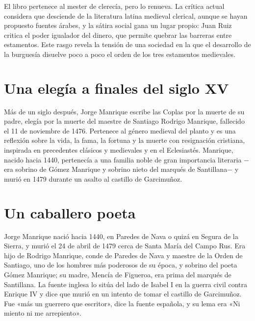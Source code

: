 \documentclass{book}
\begin{document}
El libro pertenece al mester de clerecía, pero lo renueva. La crítica actual considera que desciende de la literatura latina medieval clerical, aunque se hayan propuesto fuentes árabes, y la sátira social gana un lugar propio: Juan Ruiz critica el poder igualador del dinero, que permite quebrar las barreras entre estamentos. Este rasgo revela la tensión de una sociedad en la que el desarrollo de la burguesía disuelve poco a poco el orden de los tres estamentos medievales.


\section{Una elegía a finales del siglo XV}

Más de un siglo después, Jorge Manrique escribe las Coplas por la muerte de su padre, elegía por la muerte del maestre de Santiago Rodrigo Manrique, fallecido el 11 de noviembre de 1476. Pertenece al género medieval del planto y es una reflexión sobre la vida, la fama, la fortuna y la muerte con resignación cristiana, inspirada en precedentes clásicos y medievales y en el Eclesiastés. Manrique, nacido hacia 1440, pertenecía a una familia noble de gran importancia literaria \(-\)era sobrino de Gómez Manrique y sobrino nieto del marqués de Santillana\(-\) y murió en 1479 durante un asalto al castillo de Garcimuñoz.


\section{Un caballero poeta}

Jorge Manrique nació hacia 1440, en Paredes de Nava o quizá en Segura de la Sierra, y murió el 24 de abril de 1479 cerca de Santa María del Campo Rus. Era hijo de Rodrigo Manrique, conde de Paredes de Nava y maestre de la Orden de Santiago, uno de los hombres más poderosos de su época, y sobrino del poeta Gómez Manrique; su madre, Mencía de Figueroa, era prima del marqués de Santillana. La fuente inglesa lo sitúa del lado de Isabel I en la guerra civil contra Enrique IV y dice que murió en un intento de tomar el castillo de Garcimuñoz. Fue «más un guerrero que escritor», dice la fuente española, y su lema era «Ni miento ni me arrepiento».
\end{document}
